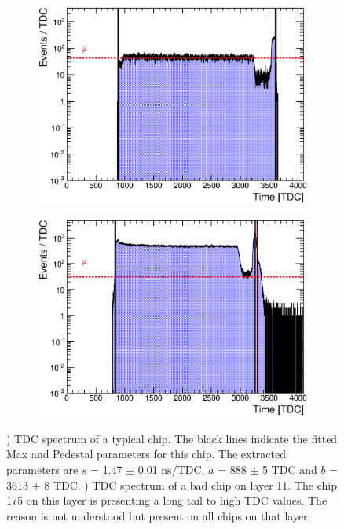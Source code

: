 \begin{figure}[htbp!]
	\begin{subfigure}[t]{0.49\textwidth}
		\centering
		\includegraphics[width=1\linewidth]{../Thesis_Plots/Timing/Muons/Plots/ExampleTDCSpectra.eps}
		\caption{} \label{fig:TDC_Spectrum}
	\end{subfigure}
	\hfill
	\begin{subfigure}[t]{0.49\textwidth}
		\centering
		\includegraphics[width=1\linewidth]{../Thesis_Plots/Timing/Muons/Plots/BadTDCSpectra_Layer11.eps}
		\caption{} \label{fig:TDC_Spectrum_bad}
	\end{subfigure}
	\caption{) TDC spectrum of a typical chip. The black lines indicate the fitted Max and Pedestal parameters for this chip. The extracted parameters are $s$ = 1.47 $\pm$ 0.01 ns/TDC, $a$ = 888 $\pm$ 5 TDC and $b$ = 3613 $\pm$ 8 TDC. ) TDC spectrum of a bad chip on layer 11. The chip 175 on this layer is presenting a long tail to high TDC values. The reason is not understood but present on all chips on that layer.}
\end{figure}

